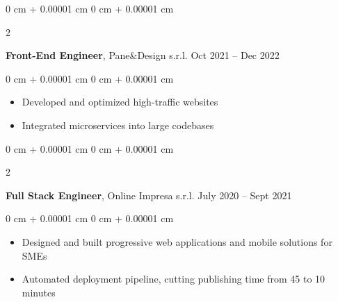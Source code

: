 \documentclass[10pt, letterpaper]{article}
\newenvironment{highlights}{
    \begin{itemize}[
        topsep=0.10 cm,
        parsep=0.10 cm,
        partopsep=0pt,
        itemsep=0pt,
        leftmargin=0 cm + 10pt
    ]
}{
    \end{itemize}
} %
\newenvironment{onecolentry}{
    \begin{adjustwidth}{
        0 cm + 0.00001 cm
    }{
        0 cm + 0.00001 cm
    }
}{
    \end{adjustwidth}
} %
\newenvironment{twocolentry}[2][]{
    \onecolentry
    \def\secondColumn{#2}
    \setcolumnwidth{\fill, 4.5 cm}
    \begin{paracol}{2}
}{
    \switchcolumn \raggedleft \secondColumn
    \end{paracol}
    \endonecolentry
} %
\begin{document}
        \vspace{0.2 cm}
        
        \begin{twocolentry}{
            Oct 2021 – Dec 2022
        }
        \textbf{Front-End Engineer}, Pane\&Design s.r.l.\end{twocolentry}

        \vspace{0.10 cm}
        \begin{onecolentry}
            \begin{highlights}
                \item Developed and optimized high-traffic websites
                \item Integrated microservices into large codebases
            \end{highlights}
        \end{onecolentry}


        \vspace{0.2 cm}

        \begin{twocolentry}{
            July 2020 – Sept 2021
        }
        \textbf{Full Stack Engineer}, Online Impresa s.r.l.\end{twocolentry}

        \vspace{0.10 cm}
        \begin{onecolentry}
            \begin{highlights}
                \item Designed and built progressive web applications and mobile solutions for SMEs
                \item Automated deployment pipeline, cutting publishing time from 45 to 10 minutes
            \end{highlights}
        \end{onecolentry}

\end{document}
